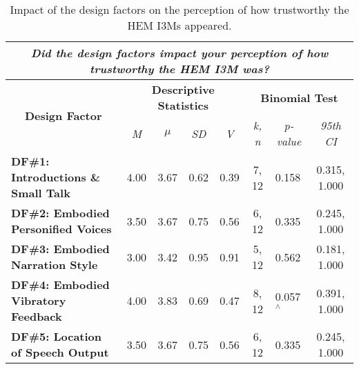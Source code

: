 \begin{table*}[!ht]
\caption{Impact of the design factors on the perception of how trustworthy the HEM I3Ms appeared.}
\label{table:9}
\begin{tabular}{@{}cccccccc@{}}
\toprule
\multicolumn{8}{c}{\textit{\textbf{Did the design factors impact your perception of how trustworthy the HEM I3M was?}}}               \\ \midrule
\multicolumn{1}{c|}{\multirow{3}{*}{\textbf{Design Factor}}} &
  \multicolumn{4}{c|}{\multirow{2}{*}{\textbf{Descriptive Statistics}}} &
  \multicolumn{3}{c}{\multirow{2}{*}{\textbf{Binomial Test}}} \\
\multicolumn{1}{c|}{}                                     & \multicolumn{4}{c|}{}                          & \multicolumn{3}{c}{}       \\
\multicolumn{1}{c|}{} &
  \textit{M} &
  \textit{$\mu$} &
  \textit{SD} &
  \multicolumn{1}{c|}{\textit{V}} &
  \textit{k, n} &
  \textit{p-value} &
  \textit{95th CI} \\ \midrule
\multicolumn{1}{l|}{\textbf{DF\#1: Introductions \& Small Talk}} & 4.00 & 3.67 & 0.62 & \multicolumn{1}{c|}{0.39} & 7, 12 & \multicolumn{1}{l}{0.158} & 0.315, 1.000 \\
\multicolumn{1}{l|}{\textbf{DF\#2: Embodied Personified Voices}} & 3.50 & 3.67 & 0.75 & \multicolumn{1}{c|}{0.56} & 6, 12 & \multicolumn{1}{l}{0.335} & 0.245, 1.000 \\
\multicolumn{1}{l|}{\textbf{DF\#3: Embodied Narration Style}}             & 3.00 & 3.42 & 0.95 & \multicolumn{1}{c|}{0.91} & 5, 12 & \multicolumn{1}{l}{0.562} & 0.181, 1.000 \\
\multicolumn{1}{l|}{\textbf{DF\#4: Embodied Vibratory Feedback}}   & 4.00 & 3.83 & 0.69 & \multicolumn{1}{c|}{0.47} & 8, 12 & \multicolumn{1}{l}{0.057$^\wedge$} & 0.391, 1.000 \\
\multicolumn{1}{l|}{\textbf{DF\#5: Location of Speech Output}}                        & 3.50 & 3.67 & 0.75 & \multicolumn{1}{c|}{0.56}                      & 6, 12 & \multicolumn{1}{l}{0.335} & 0.245, 1.000 \\ \bottomrule
\end{tabular}
\end{table*}